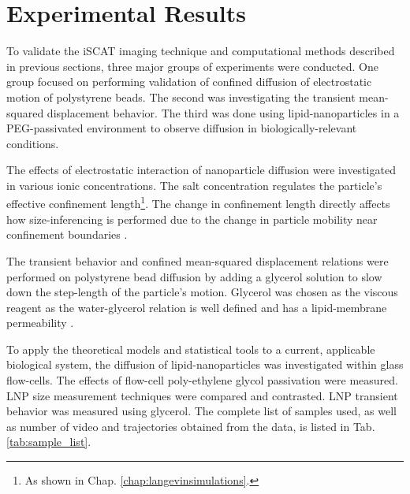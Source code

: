 \clearpage
\chapter{Experimental Results}
\label{chap:expresult}

To validate the iSCAT imaging technique and computational methods described in previous sections, three major groups of experiments were conducted. One group focused on performing validation of confined diffusion of electrostatic motion of polystyrene beads. The second was investigating the transient mean-squared displacement behavior. The third was done using lipid-nanoparticles in a PEG-passivated environment to observe diffusion in biologically-relevant conditions. 

The effects of electrostatic interaction of nanoparticle diffusion were investigated in various ionic concentrations. The salt concentration regulates the particle's effective confinement length\footnote{As shown in Chap. \ref{chap:langevinsimulations}.}. The change in confinement length directly affects how size-inferencing is performed due to the change in particle mobility near confinement boundaries \cite{bian111YearsBrownian2016}. %

The transient behavior and confined mean-squared displacement relations were performed on polystyrene bead diffusion by adding a glycerol solution to slow down the step-length of the particle's motion. Glycerol was chosen as the viscous reagent as the water-glycerol relation is well defined \cite{cheng_formula_2008} and has a lipid-membrane permeability \cite{Orbach1980, Walter1986}. 

To apply the theoretical models and statistical tools to a current, applicable biological system, the diffusion of lipid-nanoparticles was investigated within glass flow-cells. The effects of flow-cell poly-ethylene glycol passivation were measured. LNP size measurement techniques were compared and contrasted. LNP transient behavior was measured using glycerol. The complete list of samples used, as well as number of video and trajectories obtained from the data, is listed in Tab. \ref{tab:sample_list}.

